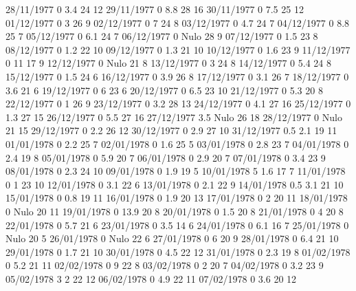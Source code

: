 28/11/1977  0      3.4    24     12 
29/11/1977  0      8.8    28     16 
30/11/1977  0      7.5    25     12 
01/12/1977  0      3      26     9 
02/12/1977  0      7      24     8 
03/12/1977  0      4.7    24     7 
04/12/1977  0      8.8    25     7 
05/12/1977  0      6.1    24     7 
06/12/1977  0     Nulo    28     9 
07/12/1977  0      1.5    23     8 
08/12/1977  0      1.2    22     10 
09/12/1977  0      1.3    21     10 
10/12/1977  0      1.6    23     9 
11/12/1977  0      11     17     9 
12/12/1977  0     Nulo    21     8 
13/12/1977  0      3      24     8 
14/12/1977  0      5.4    24     8 
15/12/1977  0      1.5    24     6 
16/12/1977  0      3.9    26     8 
17/12/1977  0      3.1    26     7 
18/12/1977  0      3.6    21     6 
19/12/1977  0      6      23     6 
20/12/1977  0      6.5    23     10 
21/12/1977  0      5.3    20     8 
22/12/1977  0      1      26     9 
23/12/1977  0      3.2    28     13 
24/12/1977  0      4.1    27     16 
25/12/1977  0      1.3    27     15 
26/12/1977  0      5.5    27     16 
27/12/1977  3.5   Nulo    26     18 
28/12/1977  0     Nulo    21     15 
29/12/1977  0      2.2    26     12 
30/12/1977  0      2.9    27     10 
31/12/1977  0.5    2.1    19     11 
01/01/1978  0      2.2    25     7 
02/01/1978  0      1.6    25     5 
03/01/1978  0      2.8    23     7 
04/01/1978  0      2.4    19     8 
05/01/1978  0      5.9    20     7 
06/01/1978  0      2.9    20     7 
07/01/1978  0      3.4    23     9 
08/01/1978  0      2.3    24     10 
09/01/1978  0      1.9    19     5 
10/01/1978  5      1.6    17     7 
11/01/1978  0      1      23     10 
12/01/1978  0      3.1    22     6 
13/01/1978  0      2.1    22     9 
14/01/1978  0.5    3.1    21     10 
15/01/1978  0      0.8    19     11 
16/01/1978  0      1.9    20     13 
17/01/1978  0      2      20     11 
18/01/1978  0     Nulo    20     11 
19/01/1978  0      13.9   20     8 
20/01/1978  0      1.5    20     8 
21/01/1978  0      4      20     8 
22/01/1978  0      5.7    21     6 
23/01/1978  0      3.5    14     6 
24/01/1978  0      6.1    16     7 
25/01/1978  0     Nulo    20     5 
26/01/1978  0     Nulo    22     6 
27/01/1978  0      6      20     9 
28/01/1978  0      6.4    21     10 
29/01/1978  0      1.7    21     10 
30/01/1978  0      4.5    22     12 
31/01/1978  0      2.3    19     8 
01/02/1978  0      5.2    21     11 
02/02/1978  0      9      22     8 
03/02/1978  0      2      20     7 
04/02/1978  0      3.2    23     9 
05/02/1978  3      2      22     12 
06/02/1978  0      4.9    22     11 
07/02/1978  0      3.6    20     12 
